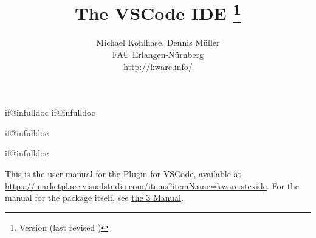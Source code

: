 \makeatletter
\ifcsname if@infulldoc\endcsname\else
    \expandafter\newif\csname if@infulldoc\endcsname\@infulldocfalse
\fi
\makeatother

\csname if@infulldoc\endcsname\else

\def\libfolder#1{../lib/#1}



\infulldoctrue


  \csname if@infulldoc\endcsname\else
	\title{
		The {\stex} VSCode IDE
		\thanks{Version {\fileversion} (last revised {\filedate})}
 	}
	\author{Michael Kohlhase, Dennis Müller\\
		FAU Erlangen-Nürnberg\\
		\url{http://kwarc.info/}
	}
	\maketitle

  This is the user manual for the \sTeX Plugin for VSCode, available at
  \url{https://marketplace.visualstudio.com/items?itemName=kwarc.stexide}.
  For the manual for the \sTeX package itself, see \href{\basedocurl/stex-manual.pdf}{the \sTeX{}3 Manual}.
	
